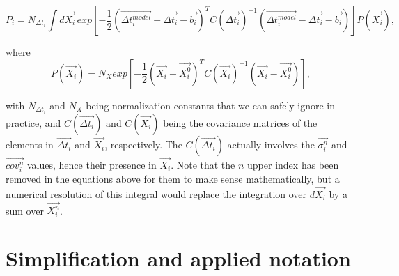 \documentclass[11pt]{scrartcl}
\renewcommand{\vec}{\overrightarrow}  %
\begin{document}
\begin{equation*}
 P_i = N_{\Delta 
t_{i}}\int d\vec{X_i}\,exp\left[-\frac{1}{2}(\vec{\Delta 
t_i^{model}}-\vec{\Delta t_i}-\vec{b_i})^T C(\vec{\Delta 
t_i})^{-1}(\vec{\Delta 
t_i^{model}}-\vec{\Delta t_i}-\vec{b_i})  \right]P(\vec{X_i}),
\end{equation*}


where
\begin{equation*}
 P(\vec{X_i}) = N_Xexp\left[-\frac{1}{2} (\vec{X_i}-\vec{X_i^0})^T 
C(\vec{X_i})^{-1} (\vec{X_i}-\vec{X_i^0})\right],
\end{equation*}

with $N_{\Delta 
t_{i}}$ and $N_X$ being normalization constants that we can safely 
ignore in practice, and $C(\vec{\Delta 
t_i})$ and $C(\vec{X_i})$ being the covariance matrices of 
the elements in $\vec{\Delta 
t_i}$ and $\vec{X_i}$, respectively. The $C(\vec{\Delta 
t_i})$ actually involves the $\vec{\sigma^n_i}$ and $\vec{cov^n_i}$ 
values, hence their presence in $\vec{X_i}$. Note that the $n$ upper 
index has been removed in the equations above for them to make sense 
mathematically, but a numerical resolution of this integral would 
replace the integration over $d\vec{X_i}$ by a sum over $\vec{X_i^n}$.

\section{Simplification and applied notation}
\end{document}
